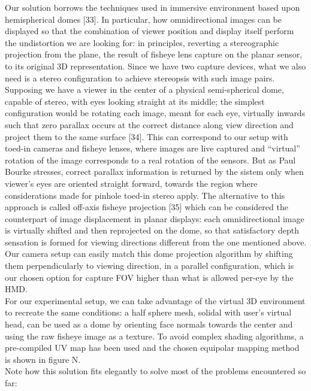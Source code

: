 Our solution borrows the techniques used in immersive environment based upon hemispherical domes [33]. In particular, how omnidirectional images can be displayed so that the combination of viewer position and display itself perform the undistortion we are looking for: in principles, reverting a stereographic projection from the plane, the result of fisheye lens capture on the planar sensor, to its original 3D representation. Since we have two capture devices, what we also need is a stereo configuration to achieve stereopsis with such image pairs. Supposing we have a viewer in the center of a physical semi-spherical dome, capable of stereo, with eyes looking straight at its middle; the simplest configuration would be rotating each image, meant for each eye,  virtually inwards such that zero parallax occurs at the correct distance along view direction and project them to the same surface [34]. This can correspond to our setup with toed-in cameras and fisheye lenses, where images are live captured and “virtual” rotation of the image corresponds to a real rotation of the sensors. But as Paul Bourke stresses, correct parallax information is returned by the sistem only when viewer’s eyes are oriented straight forward, towards the region where considerations made for pinhole toed-in stereo apply. The alternative to this approach is called off-axis fisheye projection [35] which can be considered the counterpart of image displacement in planar displays: each omnidirectional image is virtually shifted and then reprojected on the dome, so that satisfactory depth sensation is formed for viewing directions different from the one mentioned above. Our camera setup can easily match this dome projection algorithm by shifting them perpendicularly to viewing direction, in a parallel configuration, which is our chosen option for capture FOV higher than what is allowed per-eye by the HMD.\\
For our experimental setup, we can take advantage of the virtual 3D environment to recreate the same conditions: a half sphere mesh, solidal with user’s virtual head,  can be used as a dome by orienting face normals towards the center and using the raw fisheye image as a texture. To avoid complex shading algorithms, a pre-compiled UV map has been used and the chosen equipolar mapping method is shown in figure N.\\
Note how this solution fits elegantly to solve most of the problems encountered so far:
